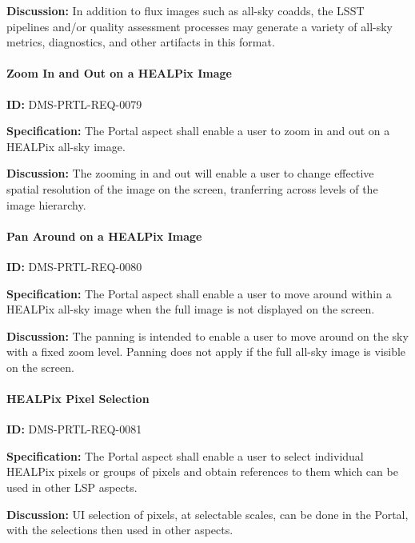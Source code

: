 \documentclass[SE,toc,lsstdraft]{lsstdoc}
\begin{document}
\textbf{Discussion:}
In addition to flux images such as all-sky coadds, the LSST pipelines and/or quality assessment processes may generate a variety of all-sky metrics, diagnostics, and other artifacts in this format.

\paragraph{Zoom In and Out on a HEALPix Image}\hfill  %

\label{DMS-PRTL-REQ-0079}
\textbf{ID:} DMS-PRTL-REQ-0079

\textbf{Specification:}
The Portal aspect shall enable a user to zoom in and out on a HEALPix all-sky image.

\textbf{Discussion:}
The zooming in and out will enable a user to change effective spatial resolution of the image on the screen, tranferring across levels of the image hierarchy.

\paragraph{Pan Around on a HEALPix Image}\hfill  %

\label{DMS-PRTL-REQ-0080}
\textbf{ID:} DMS-PRTL-REQ-0080

\textbf{Specification:}
The Portal aspect shall enable a user to move around within a HEALPix all-sky image when the full image is not displayed on the screen.

\textbf{Discussion:}
The panning is intended to enable a user to move around on the sky with a fixed zoom level.  Panning does not apply if the full all-sky image is visible on the screen.

\paragraph{HEALPix Pixel Selection}\hfill  %

\label{DMS-PRTL-REQ-0081}
\textbf{ID:} DMS-PRTL-REQ-0081

\textbf{Specification:}
The Portal aspect shall enable a user to select individual HEALPix pixels or groups of pixels and obtain references to them which can be used in other LSP aspects.

\textbf{Discussion:}
UI selection of pixels, at selectable scales, can be done in the Portal, with the selections then used in other aspects.
\end{document}
